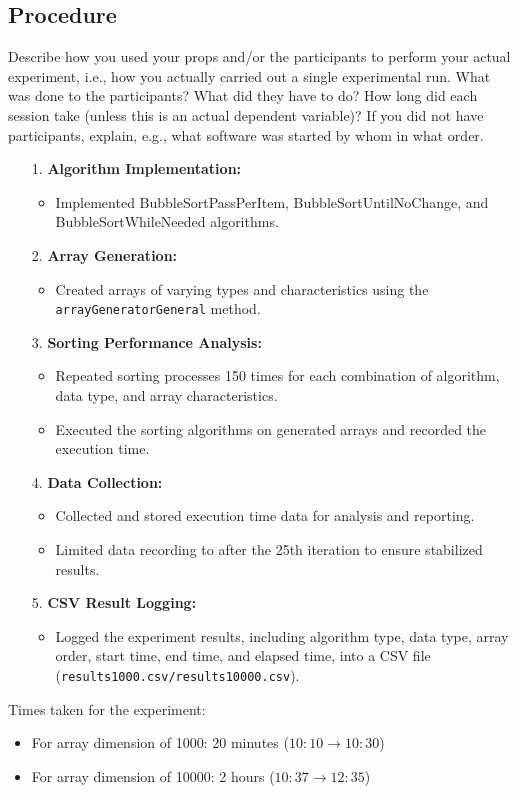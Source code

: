 \documentclass{article}
\begin{document}
\subsection{Procedure}
Describe how you used your props and/or the participants to perform your actual experiment, i.e., how you actually carried out a single experimental run. What was done to the participants? What did they have to do? How long did each session take (unless this is an actual dependent variable)? If you did not have participants, explain, e.g., what software was started by whom in what order.
\begin{itemize}
  \item[1.] \textbf{Algorithm Implementation:}
    \begin{itemize}
      \item Implemented BubbleSortPassPerItem, BubbleSortUntilNoChange, and BubbleSortWhileNeeded algorithms.
    \end{itemize}

  \item[2.] \textbf{Array Generation:}
    \begin{itemize}
      \item Created arrays of varying types and characteristics using the \texttt{arrayGeneratorGeneral} method.
    \end{itemize}

  \item[3.] \textbf{Sorting Performance Analysis:}
    \begin{itemize}
      \item Repeated sorting processes 150 times for each combination of algorithm, data type, and array characteristics.
      \item Executed the sorting algorithms on generated arrays and recorded the execution time.
    \end{itemize}

  \item[4.] \textbf{Data Collection:}
    \begin{itemize}
      \item Collected and stored execution time data for analysis and reporting.
      \item Limited data recording to after the 25th iteration to ensure stabilized results.
    \end{itemize}

  \item[5.] \textbf{CSV Result Logging:}
    \begin{itemize}
      \item Logged the experiment results, including algorithm type, data type, array order, start time, end time, and elapsed time, into a CSV file (\texttt{results1000.csv/results10000.csv}).
    \end{itemize}
\end{itemize}
Times taken for the experiment:
    \begin{itemize}
     \item For array dimension of 1000: 20 minutes ($10:10 \rightarrow 10:30$)
     \item For array dimension of 10000: 2 hours ($10:37 \rightarrow 12:35$)
    \end{itemize}
\end{document}
